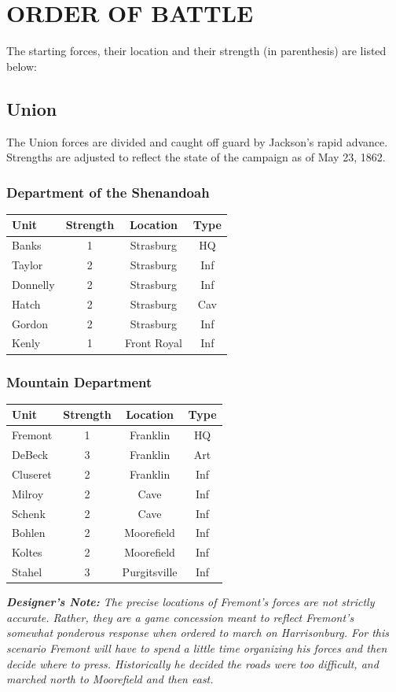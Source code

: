 \section{ORDER OF BATTLE}

The starting forces, their location and their strength (in parenthesis) are listed below:

\subsection{Union}

The Union forces are divided and caught off guard by Jackson’s rapid advance.
Strengths are adjusted to reflect the state of the campaign as of May 23, 1862.

\subsubsection{Department of the Shenandoah}

\begin{tabular}{ |l|c|c|c| }
  \hline
  Unit & Strength & Location & Type \\
  \hline
  Banks & 1 & Strasburg & HQ \\
  Taylor & 2 & Strasburg & Inf \\
  Donnelly & 2 & Strasburg & Inf \\
  Hatch & 2 & Strasburg & Cav \\
  Gordon & 2 & Strasburg & Inf \\
  Kenly & 1 & Front Royal & Inf \\
  \hline
\end{tabular}

\subsubsection{Mountain Department}

\begin{tabular}{ |l|c|c|c| }
  \hline
  Unit & Strength & Location & Type \\
  \hline
  Fremont & 1 & Franklin & HQ \\
  DeBeck & 3 & Franklin & Art \\
  Cluseret & 2 & Franklin & Inf \\
  Milroy & 2 & Cave & Inf \\
  Schenk & 2 & Cave & Inf \\
  Bohlen & 2 & Moorefield & Inf \\
  Koltes & 2 & Moorefield & Inf \\
  Stahel & 3 & Purgitsville & Inf \\
  \hline
\end{tabular}

\textit{\textbf{Designer’s Note:} The precise locations of Fremont’s forces are not strictly accurate. Rather, they are a game concession meant to reflect Fremont’s somewhat ponderous response when ordered to march on Harrisonburg. For this scenario Fremont will have to spend a little time organizing his forces and then decide where to press. Historically he decided the roads were too difficult, and marched north to Moorefield and then east.}
